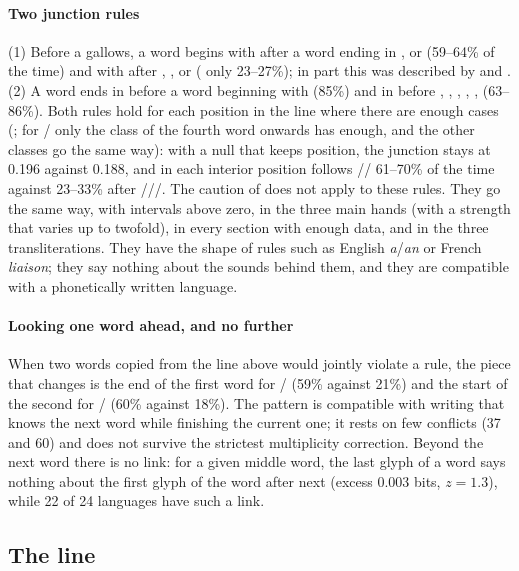 \paragraph{Two junction rules} (1) Before a gallows, a word begins with  after a word ending in ,
 or  (59--64\% of the time) and with  after , ,  or  (
only 23--27\%); in part this was described by \citet{currier1976} and \citet{smith2017o}. (2) A word ends in 
before a word beginning with  (85\%) and in  before , , , , ,
 (63--86\%). Both rules hold for each position in the line where there are enough cases
(; for / only the class of the fourth word onwards has enough, and the other classes go
the same way): with a null that keeps position, the junction stays at 0.196 against 0.188, and in each interior
position  follows // 61--70\% of the time against 23--33\% after
///. The caution of \citet{feaster2022} does not apply to these rules. They go
the same way, with intervals above zero, in the three main hands (with a strength that varies up to twofold), in every
section with enough data, and in the three transliterations. They have the shape of
rules such as English \emph{a}/\emph{an} or French \emph{liaison}; they say nothing about the sounds behind them, and
they are compatible with a phonetically written language.

\paragraph{Looking one word ahead, and no further} When two words copied from the line above would jointly violate a
rule, the piece that changes is the end of the first word for / (59\% against 21\%) and the start of the
second for / (60\% against 18\%). The pattern is compatible with writing that knows the next word while
finishing the current one; it rests on few conflicts (37 and 60) and does not survive the strictest multiplicity
correction. Beyond the next word there is no link: for a given middle word, the last glyph of a word says nothing about
the first glyph of the word after next (excess 0.003 bits, $z = 1.3$), while 22 of 24 languages have such a link.

\subsection{The line}
\label{sec:line}

